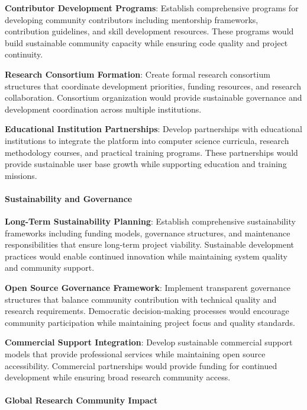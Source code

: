 \documentclass[11pt,a4paper]{article}
\begin{document}
\textbf{Contributor Development Programs}: Establish comprehensive programs for developing community contributors including
mentorship frameworks, contribution guidelines, and skill development resources. These programs would build sustainable
community capacity while ensuring code quality and project continuity.

\textbf{Research Consortium Formation}: Create formal research consortium structures that coordinate development priorities,
funding resources, and research collaboration. Consortium organization would provide sustainable governance and
development coordination across multiple institutions.

\textbf{Educational Institution Partnerships}: Develop partnerships with educational institutions to integrate the platform
into computer science curricula, research methodology courses, and practical training programs. These partnerships would
provide sustainable user base growth while supporting education and training missions.

\paragraph{Sustainability and Governance}

\textbf{Long-Term Sustainability Planning}: Establish comprehensive sustainability frameworks including funding models,
governance structures, and maintenance responsibilities that ensure long-term project viability. Sustainable development
practices would enable continued innovation while maintaining system quality and community support.

\textbf{Open Source Governance Framework}: Implement transparent governance structures that balance community contribution
with technical quality and research requirements. Democratic decision-making processes would encourage community
participation while maintaining project focus and quality standards.

\textbf{Commercial Support Integration}: Develop sustainable commercial support models that provide professional services
while maintaining open source accessibility. Commercial partnerships would provide funding for continued development
while ensuring broad research community access.

\paragraph{Global Research Community Impact}
\end{document}
